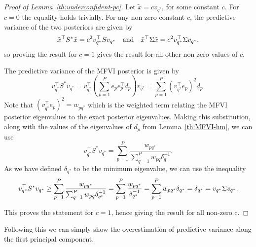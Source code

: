 \begin{proof}[Proof of Lemma~\ref{th:underconfident-pc}]
Let $\tilde x  = c v_{q^*}$, for some constant $c$. For $c=0$ the equality holds trivially. 
For any non-zero constant $c$, the predictive variance of the two posteriors are given by 
\begin{equation}
     \tilde x^\top S^* \tilde x = c^2 v_{q^*}^\top  S v_{q^*} \quad \text{and}\quad \tilde x ^\top  \Sigma \tilde x = c^2 v_{q^*}^\top  \Sigma v_{q^*},
\end{equation}
so proving the result for $c=1$ gives the result for all other non zero values of $c$. 

The predictive variance of the MFVI posterior is given by 
\begin{equation}
    v_{q^*} ^\top  S^* v_{q^*} = v_{q^*}^\top  \left(\sum_{p=1}^P e_p e_p^\top  d_p\right)v_{q^*} = \sum_{p=1}^P (v_{q^*}^\top  e_p)^2 d_p. 
\end{equation}
Note that $(v_{q^*}^\top  e_p)^2= w_{pq^*}$ which is the weighted term relating the MFVI posterior eigenvalues to the exact posterior eigenvalues. Making this substitution, along with the values of the eigenvalues of $d_p$ from Lemma~\ref{th:MFVI-hm}, we can use 
\begin{equation}
    v_{q^*} ^\top  S^* v_{q^*}  = \sum_{p=1}^P  \frac{w_{pq^* }}{ \sum_{q=1}^P w_{pq} \delta_q^{-1} }.
\end{equation}
As we have defined $\delta_{q^*}$ to be the minimum eigenvalue, we can use the inequality 
\begin{equation}
     v_{q^*} ^\top  S^* v_{q^*}  \geq \sum_{p=1}^P  \frac{w_{pq^* }}{ \sum_{q=1}^P w_{pq} \delta_{q^*}^{-1} } = \sum_{p=1}^P  \frac{w_{pq^* }}{  \delta_{q^*}^{-1} }
     = \sum_{p=1}^P  w_{pq^*} \delta_{q^*} = \delta_{q^*}
      = v_{q^*} \Sigma v_{q^*}.
\end{equation}

This proves the statement for $c=1$, hence giving the result for all non-zero c. 

\end{proof}


Following this we can simply show the overestimation of predictive variance along the first principal component. 

